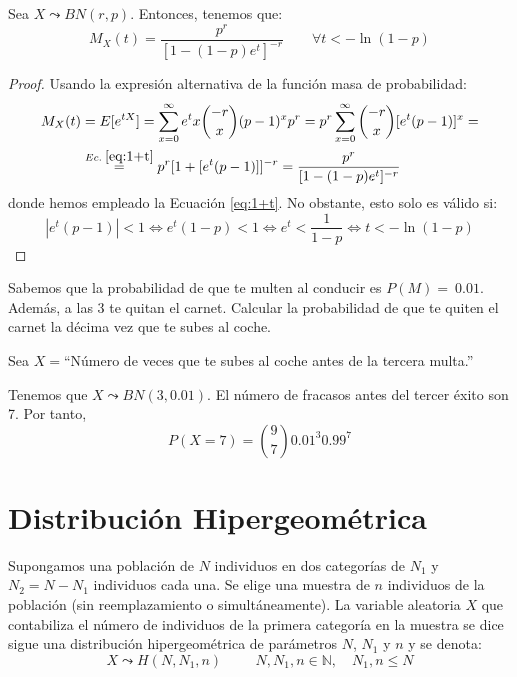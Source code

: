 \begin{prop}
    Sea $X\leadsto BN(r,p)$. Entonces, tenemos que:
    \begin{equation*}
        M_X(t)=\frac{p^r}{[1-(1-p)e^t]^{-r}} \qquad \forall t<-\ln(1-p)
    \end{equation*}
\end{prop}
\begin{proof}
    Usando la expresión alternativa de la función masa de probabilidad:
    \begin{equation*}\begin{split}
        M_X(t)
        &=E[e^{tX}]
        = \sum_{x=0}^\infty e^tx \binom{-r}{x}(p-1)^xp^r
        = p^r\sum_{x=0}^\infty \binom{-r}{x}[e^t(p-1)]^x =\\
        & \stackrel{Ec.\;\ref{eq:1+t}}{=} p^r [1+[e^t(p-1)]]^{-r}
        = \frac{p^r}{[1-(1-p)e^t]^{-r}}
    \end{split}\end{equation*}
    donde hemos empleado la Ecuación \ref{eq:1+t}. No obstante, esto solo es válido si:
    \begin{equation*}
        |e^t(p-1)|<1
        \Longleftrightarrow e^t(1-p)<1
        \Longleftrightarrow e^t < \frac{1}{1-p}
        \Longleftrightarrow t < -\ln(1-p)
    \end{equation*}
\end{proof}

\begin{ejemplo}
    Sabemos que la probabilidad de que te multen al conducir es $P(M)=~0.01$. Además, a las 3 te quitan el carnet. Calcular la probabilidad de que te quiten el carnet la décima vez que te subes al coche.

    Sea $X=$``Número de veces que te subes al coche antes de la tercera multa.''
    
    Tenemos que $X\leadsto BN(3,0.01)$. El número de fracasos antes del tercer éxito son 7. Por tanto,
    \begin{equation*}
        P(X=7) = \binom{9}{7} 0.01^3 0.99^7
    \end{equation*}
\end{ejemplo}


\section{Distribución Hipergeométrica}

\begin{definicion}
    Supongamos una población de $N$ individuos en dos categorías de $N_1$ y $N_2 =N-N_1$ individuos cada una. Se elige una muestra de $n$ individuos de la población (sin reemplazamiento o simultáneamente). La variable aleatoria $X$ que contabiliza el número de individuos de la primera categoría en la muestra se dice sigue una distribución hipergeométrica de parámetros $N$, $N_1$ y $n$ y se denota:
    \begin{equation*}
        X\leadsto H(N,N_1,n) \hspace{1cm} N,N_1,n\in \mathbb{N},\quad N_1,n\leq N
    \end{equation*}
\end{definicion}


